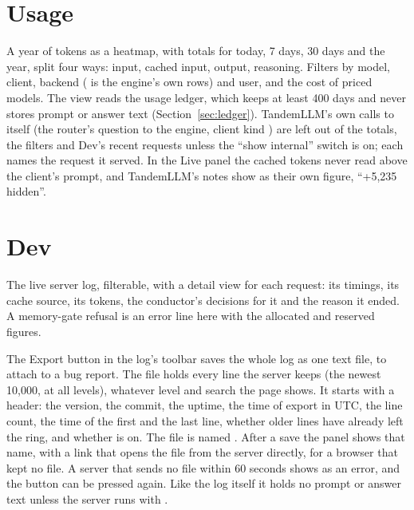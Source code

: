 \section{Usage}

A year of tokens as a heatmap, with totals for today, 7 days, 30 days and the year, split four ways: input, cached input, output, reasoning. Filters by model, client, backend ( is the engine's own rows) and user, and the cost of priced models. The view reads the usage ledger, which keeps at least 400 days and never stores prompt or answer text (Section~\ref{sec:ledger}). TandemLLM's own calls to itself (the router's question to the engine, client kind ) are left out of the totals, the filters and Dev's recent requests unless the \enquote{show internal} switch is on; each names the request it served. In the Live panel the cached tokens never read above the client's prompt, and TandemLLM's notes show as their own figure, \enquote{+5,235 hidden}.


\section{Dev}\label{sec:dash-dev}

The live server log, filterable, with a detail view for each request: its timings, its cache source, its tokens, the conductor's decisions for it and the reason it ended. A memory-gate refusal is an error line here with the allocated and reserved figures.

The Export button in the log's toolbar saves the whole log as one text file, to attach to a bug report. The file holds every line the server keeps (the newest 10,000, at all levels), whatever level and search the page shows. It starts with a header: the version, the commit, the uptime, the time of export in UTC, the line count, the time of the first and the last line, whether older lines have already left the ring, and whether  is on. The file is named . After a save the panel shows that name, with a link that opens the file from the server directly, for a browser that kept no file. A server that sends no file within 60 seconds shows as an error, and the button can be pressed again. Like the log itself it holds no prompt or answer text unless the server runs with .

